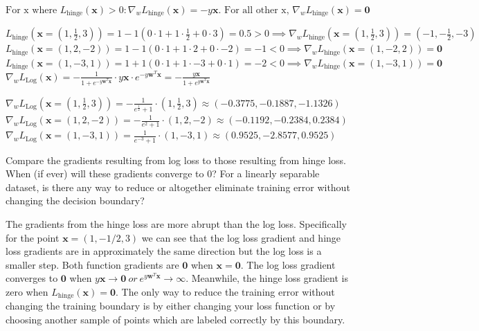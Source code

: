 \begin{solution}
  \\
  $\text{For x where } L_{\text{hinge}}(\mathbf{x}) > 0: \nabla_{w}L_{\text{hinge}}(\mathbf{x}) = -y\mathbf{x}. \text{ For all other x, } \nabla_{w}L_{\text{hinge}}(\mathbf{x}) = \mathbf{0}$

  $L_{\text{hinge}}(\mathbf{x} = (1, \frac{1}{2}, 3)) = 1 - 1 ( 0 \cdot 1 + 1 \cdot \frac{1}{2} + 0 \cdot 3) = 0.5 > 0 \implies \nabla_{w}L_{\text{hinge}}(\mathbf{x} = (1, \frac{1}{2}, 3)) = (-1, -\frac{1}{2}, -3) $
  $L_{\text{hinge}}(\mathbf{x} = (1, 2, -2)) = 1 - 1 ( 0 \cdot 1 + 1 \cdot 2 + 0 \cdot -2) = -1 < 0 \implies \nabla_{w}L_{\text{hinge}}(\mathbf{x} = (1, -2, 2)) = \mathbf{0}$
  $L_{\text{hinge}}(\mathbf{x} = (1, -3, 1)) = 1 + 1 ( 0 \cdot 1 + 1 \cdot -3 + 0 \cdot 1) = -2 < 0 \implies \nabla_{w}L_{\text{hinge}}(\mathbf{x} = (1, -3, 1)) = \mathbf{0}$ \\

  $\nabla_{w}L_{\text{Log}}(\mathbf{x}) = -\frac{1}{1 + e^{-y\mathbf{w}^T\mathbf{x}}} \cdot y\mathbf{x}\cdot e^{-y\mathbf{w}^T\mathbf{x}} = -\frac{y\mathbf{x}}{1 + e^{y\mathbf{w}^T\mathbf{x}}}$

  $\nabla_{w}L_{\text{Log}}(\mathbf{x} = (1, \frac{1}{2}, 3) ) = -\frac{1}{e^{\frac{1}{2}} + 1} \cdot (1, \frac{1}{2}, 3) \approx (-0.3775, -0.1887, -1.1326)$ \\
  $\nabla_{w}L_{\text{Log}}(\mathbf{x} = (1, 2, -2)) = -\frac{1}{e^{2} + 1} \cdot (1, 2, -2) \approx     (-0.1192, -0.2384, 0.2384)$ \\
  $\nabla_{w}L_{\text{Log}}(\mathbf{x} = (1, -3, 1)) = \frac{1}{e^{-3} + 1} \cdot (1, -3, 1) \approx      (0.9525, -2.8577, 0.9525)$ \\
\end{solution}

\problem[4]
Compare the gradients resulting from log loss to those resulting from hinge loss. When (if ever) will these gradients converge to 0? For a linearly separable dataset, is there any way to reduce or altogether eliminate training error without changing the decision boundary?

\begin{solution}
  The gradients from the hinge loss are more abrupt than the log loss. Specifically for the point $\mathbf{x} = (1, -1/2, 3)$ we can see that the log loss gradient and hinge loss gradients are in approximately the same direction but the log loss is a smaller step. Both function gradients are $\mathbf{0}$ when $\mathbf{x} = \mathbf{0}$. The log loss gradient converges to $\mathbf{0}$ when $y\mathbf{x} \to \mathbf{0} \ or \ e^{y\mathbf{w}^T\mathbf{x}} \to \infty$. Meanwhile, the hinge loss gradient is zero when $L_{\text{hinge}}(\mathbf{x}) = \mathbf{0}$. The only way to reduce the training error without changing the training boundary is by either changing your loss function or by choosing another sample of points which are labeled correctly by this boundary.
\end{solution}

